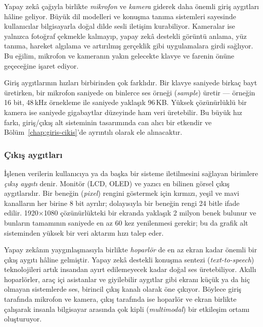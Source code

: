 Yapay zekâ çağıyla birlikte \emph{mikrofon} ve \emph{kamera} giderek daha önemli giriş aygıtları hâline geliyor. Büyük dil modelleri ve konuşma tanıma sistemleri sayesinde kullanıcılar bilgisayarla doğal dilde sesli iletişim kurabiliyor. Kameralar ise yalnızca fotoğraf çekmekle kalmayıp, yapay zekâ destekli görüntü anlama, yüz tanıma, hareket algılama ve artırılmış gerçeklik gibi uygulamalara girdi sağlıyor. Bu eğilim, mikrofon ve kameranın yakın gelecekte klavye ve farenin önüne geçeceğine işaret ediyor.

Giriş aygıtlarının hızları birbirinden çok farklıdır. Bir klavye saniyede birkaç bayt üretirken, bir mikrofon saniyede on binlerce ses örneği (\emph{sample}) üretir --- örneğin 16 bit, 48\,kHz örnekleme ile saniyede yaklaşık 96\,KB. Yüksek çözünürlüklü bir kamera ise saniyede gigabaytlar düzeyinde ham veri üretebilir. Bu büyük hız farkı, giriş/çıkış alt sisteminin tasarımında can alıcı bir etkendir ve Bölüm~\ref{chap:giris-cikis}'de ayrıntılı olarak ele alınacaktır.

\subsubsection*{Çıkış aygıtları}
İşlenen verilerin kullanıcıya ya da başka bir sisteme iletilmesini sağlayan birimlere \emph{çıkış aygıtı} denir. Monitör (LCD, OLED) ve yazıcı en bilinen görsel çıkış aygıtlarıdır. Bir beneğin (\emph{pixel}) rengini göstermek için kırmızı, yeşil ve mavi kanalların her birine 8 bit ayrılır; dolayısıyla bir beneğin rengi 24 bitle ifade edilir. 1920$\times$1080 çözünürlükteki bir ekranda yaklaşık 2 milyon benek bulunur ve bunların tamamının saniyede en az 60 kez yenilenmesi gerekir; bu da grafik alt sisteminden yüksek bir veri aktarım hızı talep eder.

Yapay zekânın yaygınlaşmasıyla birlikte \emph{hoparlör} de en az ekran kadar önemli bir çıkış aygıtı hâline gelmiştir. Yapay zekâ destekli konuşma sentezi (\emph{text-to-speech}) teknolojileri artık insandan ayırt edilemeyecek kadar doğal ses üretebiliyor. Akıllı hoparlörler, araç içi asistanlar ve giyilebilir aygıtlar gibi ekranı küçük ya da hiç olmayan sistemlerde ses, birincil çıkış kanalı olarak öne çıkıyor. Böylece giriş tarafında mikrofon ve kamera, çıkış tarafında ise hoparlör ve ekran birlikte çalışarak insanla bilgisayar arasında çok kipli (\emph{multimodal}) bir etkileşim ortamı oluşturuyor.

